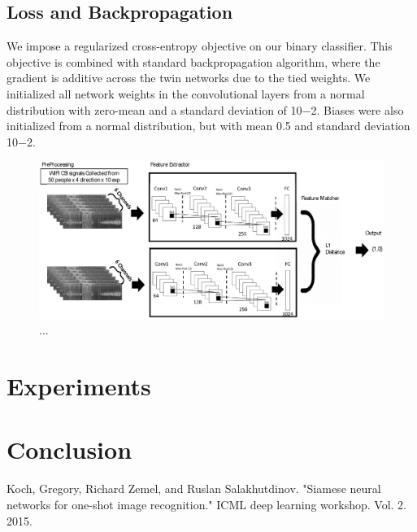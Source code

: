 \documentclass[runningheads]{llncs}
\begin{document}
\subsection{Loss and Backpropagation}
 We impose a regularized cross-entropy objective on our binary classifier.
This objective is combined with standard backpropagation algorithm, where the gradient is additive across the twin networks due to the tied weights.
 We initialized all network weights in the convolutional layers from a normal distribution with zero-mean and a standard deviation of 10−2. Biases were also initialized from a normal distribution, but with mean 0.5 and standard deviation 10−2.
\begin{figure}
\includegraphics[width=\textwidth]{network1.eps}
\caption{...} \label{network1}
\end{figure}

\section{Experiments}
\section{Conclusion}

%
%
%
% 
% 
%
\begin{thebibliography}{8}
Koch, Gregory, Richard Zemel, and Ruslan Salakhutdinov.
 "Siamese neural networks for one-shot image recognition." 
 ICML deep learning workshop. Vol. 2. 2015.


\end{thebibliography}
\end{document}
